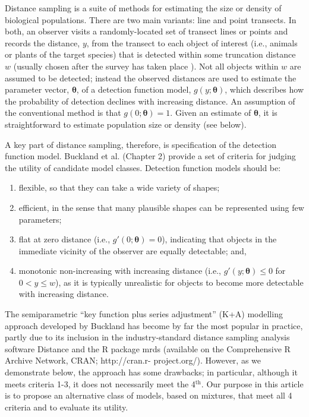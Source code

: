 \documentclass[10pt]{article}
\begin{document}
Distance sampling \cite{Buckland:2001vm,Buckland:2004ts} is a suite of methods for estimating the size or density of biological populations.  There are two main variants: line and point transects. In both, an observer visits a randomly-located set of transect lines or points and records the distance, $y$, from the transect to each object of interest (i.e., animals or plants of the target species) that is detected within some truncation distance $w$ (usually chosen after the survey has taken place \cite{Buckland:2001vm}).  Not all objects within $w$ are assumed to be detected; instead the observed distances are used to estimate the parameter vector, $\boldsymbol{\theta}$, of a detection function model, $g(y;\boldsymbol{\theta})$, which describes how the probability of detection declines with increasing distance.  An assumption of the conventional method is that $g(0;\boldsymbol{\theta})=1$. Given an estimate of $\boldsymbol{\theta}$, it is straightforward to estimate population size or density (see below).

A key part of distance sampling, therefore, is specification of the detection function model. Buckland et al. (Chapter 2) \cite{Buckland:2001vm} provide a set of criteria for judging the utility of candidate model classes. Detection function models should be:
\begin{enumerate}
\item flexible, so that they can take a wide variety of shapes;
\item efficient, in the sense that many plausible shapes can be represented using few parameters;
\item flat at zero distance (i.e., $g'(0;\boldsymbol{\theta})=0$), indicating that objects in the immediate vicinity of the observer are equally detectable; and,
\item monotonic non-increasing with increasing distance (i.e., $g'(y;\boldsymbol{\theta}) \leq 0$ for $0<y\leq w$), as it is typically unrealistic for objects to become more detectable with increasing distance.
\end{enumerate}
The semiparametric ``key function plus series adjustment'' (K+A) modelling approach developed by Buckland \cite{Buckland:1992wy} has become by far the most popular in practice, partly due to its inclusion in the industry-standard distance sampling analysis software Distance \cite{Thomas:2010cf} and the R \cite{Team:2013wf} package mrds \cite{mrds} (available on the Comprehensive R Archive Network, CRAN; http://cran.r- project.org/).  However, as we demonstrate below, the approach has some drawbacks; in particular, although it meets criteria 1-3, it does not necessarily meet the 4$^\text{th}$.  Our purpose in this article is to propose an alternative class of models, based on mixtures, that meet all 4 criteria and to evaluate its utility.  
\end{document}

